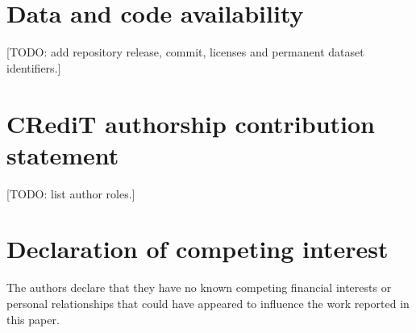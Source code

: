 \documentclass[preprint,12pt]{elsarticle}
\begin{document}
\section*{Data and code availability}
[TODO: add repository release, commit, licenses and permanent dataset identifiers.]

\section*{CRediT authorship contribution statement}
[TODO: list author roles.]

\section*{Declaration of competing interest}
The authors declare that they have no known competing financial interests or personal
relationships that could have appeared to influence the work reported in this paper.



\end{document}

